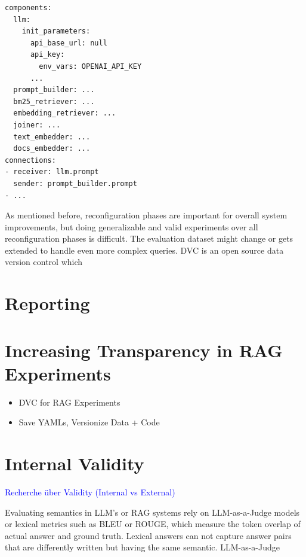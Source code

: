 \newpage
\begin{verbatim}
components:
  llm:
    init_parameters:
      api_base_url: null
      api_key:
        env_vars: OPENAI_API_KEY
      ...
  prompt_builder: ...
  bm25_retriever: ...
  embedding_retriever: ...
  joiner: ...
  text_embedder: ...
  docs_embedder: ...
connections:
- receiver: llm.prompt
  sender: prompt_builder.prompt
- ...
\end{verbatim}

As mentioned before, reconfiguration phases are important for overall system improvements, but doing generalizable and valid experiments over all reconfiguration phases is difficult. The evaluation dataset might change or gets extended to handle even more complex queries. DVC\cite{dvc.17.03.2025} is an open source data version control which 


\section{Reporting}

\section{Increasing Transparency in RAG Experiments}

\begin{itemize}
    \item DVC for RAG Experiments
    \item Save YAMLs, Versionize Data + Code
\end{itemize}

\section{Internal Validity}

\textcolor{blue}{Recherche über Validity (Internal vs External)}


Evaluating semantics in LLM's or RAG systems rely on LLM-as-a-Judge models or lexical metrics such as BLEU or ROUGE, which measure the token overlap of actual answer and ground truth. Lexical answers can not capture answer pairs that are differently written but having the same semantic. LLM-as-a-Judge 

